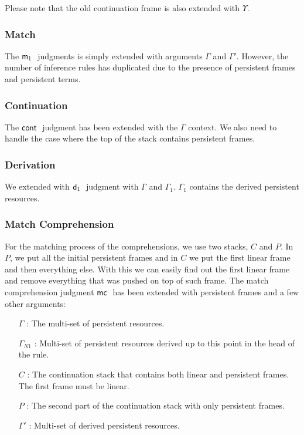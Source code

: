 Please note that the old continuation frame is also extended with $\Upsilon$.

\subsubsection{Match}

The $\mathsf{m}_1 \;$ judgments is simply extended with arguments $\Gamma$ and $\Gamma'$.
However, the number of inference rules has duplicated due to the presence of persistent frames and persistent terms.



\subsubsection{Continuation}

The $\mathsf{cont} \;$ judgment has been extended with the $\Gamma$ context. We also need to handle the case where the top of the stack contains persistent frames.



\subsubsection{Derivation}

We extended with $\mathsf{d}_1 \;$ judgment with $\Gamma$ and $\Gamma_1$. $\Gamma_1$ contains the derived persistent resources.



\subsubsection{Match Comprehension}

For the matching process of the comprehensions, we use two stacks, $C$ and $P$. In $P$, we put all the initial persistent frames and in $C$ we put the first linear frame and then everything else. With this we can easily find out the first linear frame and remove everything that was pushed on top of such frame.
The match comprehension judgment $\mathsf{mc} \;$ has been extended with persistent frames and a few other arguments:

\begin{enumerate}
   \item[$\Gamma$]: The multi-set of persistent resources.
   \item[$\Gamma_{N1}$]: Multi-set of persistent resources derived up to this point in the head of the rule.
   \item[$C$]: The continuation stack that contains both linear and persistent frames. The first frame must be linear.
   \item[$P$]: The second part of the continuation stack with only persistent frames.
   \item[$\Gamma'$]: Multi-set of derived persistent resources.
\end{enumerate}

